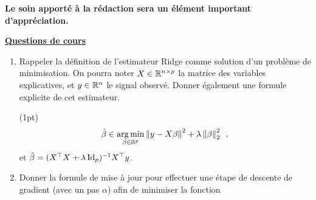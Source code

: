 \documentclass[a4paper,11pt,twoside]{exam}
\begin{document}
\sloppy
\myheader


\begin{center}
\textbf{Le soin apporté à la rédaction sera un élément important d'appréciation.}
\end{center}



\begin{center}
\bigskip
\underline{\large \textbf{Questions de cours}} %
\end{center}



\begin{enumerate}[label=QdC - \arabic*.]
    \item Rappeler la définition de l'estimateur Ridge comme solution d'un problème de minimisation.
    On pourra noter $X \in \mathbb{R}^{n\times p}$ la matrice des variables explicatives, et $y\in \mathbb{R}^n$ le signal observé.
    Donner également une formule explicite de cet estimateur.

    \begin{solution}(1pt)
    \begin{align*}
        \hat\beta \in \operatorname*{arg\,min}_{\beta \in \mathbb{R}^p} \left \lVert y - X \beta \right \rVert^2 + \lambda \left \lVert \beta \right \rVert^2_2\enspace,
    \end{align*} et $\hat\beta = (X^\top X + \lambda \operatorname{Id}_p)^{-1} X^\top y$.
    \end{solution}
    \item Donner la formule de mise à jour pour effectuer une étape de descente de gradient (avec un pas $\alpha$) afin de minimiser la fonction
\end{enumerate}
\end{document}
